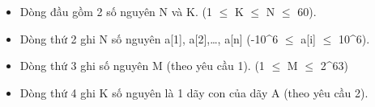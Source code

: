 \begin{itemize}
	\item     Dòng đầu gồm 2 số nguyên N và K. (1  $\le$  K  $\le$  N  $\le$  60).   
	\item     Dòng thứ 2 ghi N số nguyên a[1], a[2],…, a[n] (-10^6  $\le$  a[i]  $\le$  10^6).   
	\item     Dòng thứ 3 ghi số nguyên M (theo yêu cầu 1). (1  $\le$  M  $\le$  2^63)   
	\item     Dòng thứ 4 ghi K số nguyên là 1 dãy con của dãy A (theo yêu cầu 2).   
\end{itemize}